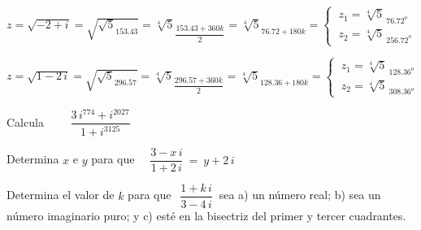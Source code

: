 \begin{miejercicio}
\vspace{2mm} $z=\sqrt{-2+i}=\sqrt{\sqrt{5}_{153.43}}=\sqrt[4]{5}_{\dfrac{153.43+360k}{2}}=\sqrt[4]{5}_{76.72+180k}=\begin{cases}
\ z_1=\sqrt[4]{5}_{\ 76.72^o}	 \\ \ z_2=\sqrt[4]{5}_{\ 256.72^o} \end{cases}$

\vspace{2mm} $z=\sqrt{1-2\, i}=\sqrt{\sqrt{5}_{296.57}}=\sqrt[4]{5}_{\dfrac{296.57+360k}{2}}=\sqrt[4]{5}_{128.36+180k}=\begin{cases}
\ z_1=\sqrt[4]{5}_{\ 128.36^o}	 \\ \ z_2=\sqrt[4]{5}_{\ 308.36^o} \end{cases}$


\end{miejercicio}

\vspace{10mm}%

\begin{mipropuesto}

Calcula $\qquad \dfrac{3\, i^{774}+i^{2027}}{1+i^{3125}}$	
\end{mipropuesto}

\vspace{-8mm}
\begin{flushright}
\begin{footnotesize} \textcolor{gris}{}	\end{footnotesize}
\end{flushright}


\begin{mipropuesto}

Determina $x$ e $y$ para que $\quad \dfrac{3-x\, i}{1+2\, i}\ = \ y+2\, i$	
\end{mipropuesto}

\vspace{-8mm}
\begin{flushright}
\begin{footnotesize} \textcolor{gris}{}	\end{footnotesize}
\end{flushright}


\begin{mipropuesto}

Determina el valor de $k$ para que $\ \ \dfrac{1+k\, i}{3-4\, i} \ $ sea a) un número real;  b) sea un número imaginario puro; y c) esté en la bisectriz del primer y tercer cuadrantes.	
\end{mipropuesto}

